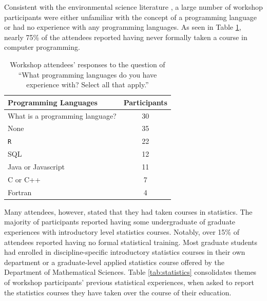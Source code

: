 \documentclass[12pt]{article}
\begin{document}
\quad Consistent with the environmental science literature \citep{andelman, hampton, hernandez, datacarpentry}, a large number of workshop participants were either unfamiliar with the concept of a programming language or had no experience with any programming languages. As seen in Table \ref{tab:programming}, nearly 75\% of the attendees reported having never formally taken a course in computer programming.    \\

{
\begin{table}[h!]
    \centering
    \begin{tabular}{lc}
\hline
Programming Languages & Participants \\
\hline
What is a programming language? & 30 \\
None & 35 \\
\texttt{R} & 22 \\
SQL & 12 \\
Java or Javascript & 11 \\
C or C++ & 7 \\
Fortran & 4 \\
\hline
\end{tabular}
\caption{Workshop attendees' responses to the question of ``What programming languages do you have experience with? Select all that apply.''}
    \label{tab:programming}
\end{table}
}

\quad Many attendees, however, stated that they had taken courses in statistics. The majority of participants reported having some undergraduate of graduate experiences with introductory level statistics courses. Notably, over 15\% of attendees reported having no formal statistical training. Most graduate students had enrolled in discipline-specific introductory statistics courses in their own department or a graduate-level applied statistics course offered by the Department of Mathematical Sciences. Table \ref{tab:statistics} consolidates themes of workshop participants' previous statistical experiences, when asked to report the statistics courses they have taken over the course of their education. 
\end{document}
